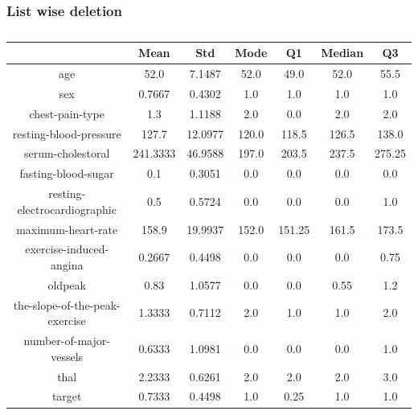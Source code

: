 \documentclass{classrep}
\begin{document}
{{            \subsubsection{List wise deletion}
            \label{results:15-percent:list-wise} {
                \begin{table}[!htbp]
                    \centering
                    \begin{tabular}{|c|c|c|c|c|c|c|}
                        \hline
                        & Mean & Std & Mode & Q1 & Median & Q3 \\ \hline
                        age & 52.0 & 7.1487 & 52.0 & 49.0 & 52.0 & 55.5 \\ \hline
                        sex & 0.7667 & 0.4302 & 1.0 & 1.0 & 1.0 & 1.0 \\ \hline
                        chest-pain-type & 1.3 & 1.1188 & 2.0 & 0.0 & 2.0 & 2.0 \\ \hline
                        resting-blood-pressure & 127.7 & 12.0977 & 120.0 & 118.5 & 126.5 & 138.0 \\ \hline
                        serum-cholestoral & 241.3333 & 46.9588 & 197.0 & 203.5 & 237.5 & 275.25 \\ \hline
                        fasting-blood-sugar & 0.1 & 0.3051 & 0.0 & 0.0 & 0.0 & 0.0 \\ \hline
                        resting-electrocardiographic & 0.5 & 0.5724 & 0.0 & 0.0 & 0.0 & 1.0 \\ \hline
                        maximum-heart-rate & 158.9 & 19.9937 & 152.0 & 151.25 & 161.5 & 173.5 \\ \hline
                        exercise-induced-angina & 0.2667 & 0.4498 & 0.0 & 0.0 & 0.0 & 0.75 \\ \hline
                        oldpeak & 0.83 & 1.0577 & 0.0 & 0.0 & 0.55 & 1.2 \\ \hline
                        the-slope-of-the-peak-exercise & 1.3333 & 0.7112 & 2.0 & 1.0 & 1.0 & 2.0 \\ \hline
                        number-of-major-vessels & 0.6333 & 1.0981 & 0.0 & 0.0 & 0.0 & 1.0 \\ \hline
                        thal & 2.2333 & 0.6261 & 2.0 & 2.0 & 2.0 & 3.0 \\ \hline
                        target & 0.7333 & 0.4498 & 1.0 & 0.25 & 1.0 & 1.0 \\ \hline
                    \end{tabular}
                    \caption{}
                    \label{result_15_List-wise-deletion}
                \end{table}
                \FloatBarrier

}}}
\end{document}

